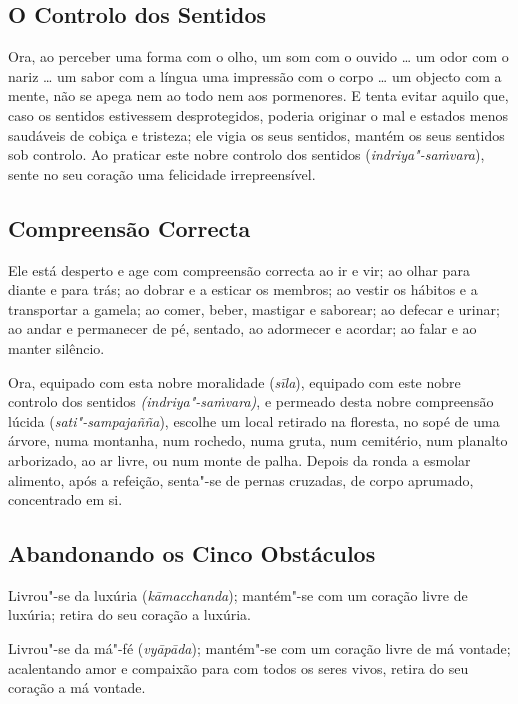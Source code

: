 \clearpage

\subsection{O Controlo dos Sentidos}


Ora, ao perceber uma forma com o olho, um som com o ouvido \ldots{} um odor com
o nariz \ldots{} um sabor com a língua uma impressão com o corpo \ldots{} um
objecto com a mente, não se apega nem ao todo nem aos pormenores. E tenta evitar
aquilo que, caso os sentidos estivessem desprotegidos, poderia originar o mal e
estados menos saudáveis de cobiça e tristeza; ele vigia os seus sentidos, mantém
os seus sentidos sob controlo. Ao praticar este nobre controlo dos sentidos
(\emph{indriya"-saṁvara}), sente no seu coração uma felicidade irrepreensível.

\subsection{Compreensão Correcta}


Ele está desperto e age com compreensão correcta ao ir e vir; ao olhar para
diante e para trás; ao dobrar e a esticar os membros; ao vestir os hábitos e a
transportar a gamela; ao comer, beber, mastigar e saborear; ao defecar e urinar;
ao andar e permanecer de pé, sentado, ao adormecer e acordar; ao falar e ao
manter silêncio.

Ora, equipado com esta nobre moralidade (\emph{sīla}), equipado com este nobre
controlo dos sentidos \emph{(indriya"-saṁvara)}, e permeado desta nobre
compreensão lúcida (\emph{sati"-sampajañña}), escolhe um local retirado na
floresta, no sopé de uma árvore, numa montanha, num rochedo, numa gruta, num
cemitério, num planalto arborizado, ao ar livre, ou num monte de palha. Depois
da ronda a esmolar alimento, após a refeição, senta"-se de pernas cruzadas, de
corpo aprumado, concentrado em si.

\subsection{Abandonando os Cinco Obstáculos}

Livrou"-se da luxúria (\emph{kāmacchanda}); mantém"-se com um coração livre de
luxúria; retira do seu coração a luxúria.

Livrou"-se da má"-fé (\emph{vyāpāda}); mantém"-se com um coração livre de má
vontade; acalentando amor e compaixão para com todos os seres vivos, retira do
seu coração a má vontade.

